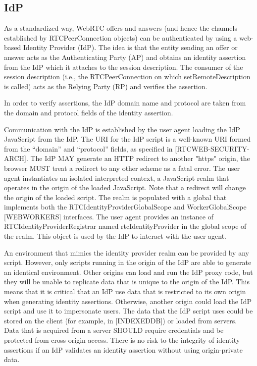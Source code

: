 \documentclass[conference]{IEEEtran}
\begin{document}
\subsection{IdP}
As a standardized way, WebRTC oﬀers and answers (and hence the channels established by
RTCPeerConnection objects) can be authenticated by using a web-based Identity
Provider (IdP). The idea is that the entity sending an oﬀer or answer acts as the
Authenticating Party (AP) and obtains an identity assertion from the IdP which it
attaches to the session description. The consumer of the session description (i.e.,
the RTCPeerConnection on which setRemoteDescription is called) acts as the
Relying Party (RP) and veriﬁes the assertion. %

In order to verify assertions, the IdP domain name and protocol are taken from the
domain and protocol fields of the identity assertion.

Communication with the IdP is established by the user agent loading the IdP JavaScript from
the IdP. The URI for the IdP script is a well-known URI formed from the “domain”
and “protocol” ﬁelds, as speciﬁed in [RTCWEB-SECURITY-ARCH].
The IdP MAY generate an HTTP redirect to another "https" origin, the browser
MUST treat a redirect to any other scheme as a fatal error.
The user agent instantiates an isolated interpreted context, a JavaScript realm that
operates in the origin of the loaded JavaScript. Note that a redirect will change the
origin of the loaded script.
The realm is populated with a global that implements both the
RTCIdentityProviderGlobalScope and WorkerGlobalScope [WEBWORKERS]
interfaces.
The user agent provides an instance of RTCIdentityProviderRegistrar named
rtcIdentityProvider in the global scope of the realm. This object is used by the IdP to
interact with the user agent.

An environment that mimics the identity provider realm can be provided by any
script. However, only scripts running in the origin of the IdP are able to generate an
identical environment. Other origins can load and run the IdP proxy code, but they
will be unable to replicate data that is unique to the origin of the IdP.
This means that it is critical that an IdP use data that is restricted to its own origin
when generating identity assertions. Otherwise, another origin could load the IdP
script and use it to impersonate users.
The data that the IdP script uses could be stored on the client (for example, in
[INDEXEDDB]) or loaded from servers. Data that is acquired from a server SHOULD
require credentials and be protected from cross-origin access.
There is no risk to the integrity of identity assertions if an IdP validates an identity
assertion without using origin-private data.
\end{document}
